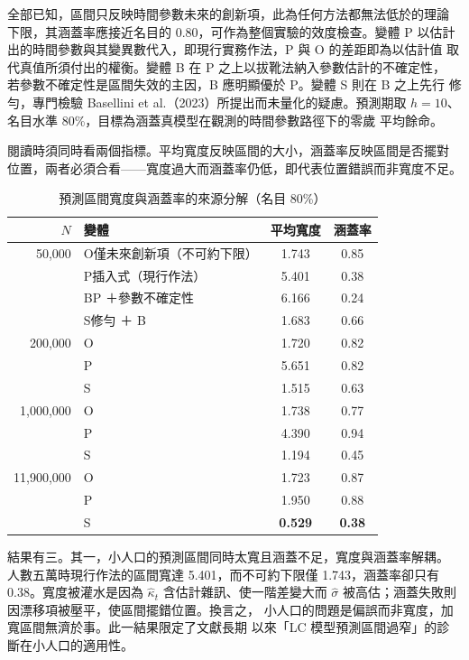 \documentclass[UTF8, fontset=macnew, a4paper, 12pt]{ctexart}
\begin{document}
全部已知，區間只反映時間參數未來的創新項，此為任何方法都無法低於的理論
下限，其涵蓋率應接近名目的 0.80，可作為整個實驗的效度檢查。變體 P 以估計
出的時間參數與其變異數代入，即現行實務作法，P 與 O 的差距即為以估計值
取代真值所須付出的權衡。變體 B 在 P 之上以拔靴法納入參數估計的不確定性，
若參數不確定性是區間失效的主因，B 應明顯優於 P。變體 S 則在 B 之上先行
修勻，專門檢驗 Basellini et al.（2023）所提出而未量化的疑慮。預測期取
$h=10$、名目水準 80\%，目標為涵蓋真模型在觀測的時間參數路徑下的零歲
平均餘命。

閱讀時須同時看兩個指標。平均寬度反映區間的大小，涵蓋率反映區間是否擺對
位置，兩者必須合看——寬度過大而涵蓋率仍低，即代表位置錯誤而非寬度不足。

\begin{table}[H]
\centering
\caption{預測區間寬度與涵蓋率的來源分解（名目 80\%）}
\small
\begin{tabular}{rlcc}
\toprule
$N$ & 變體 & 平均寬度 & 涵蓋率\\
\midrule
50,000 & O\quad 僅未來創新項（不可約下限） & 1.743 & 0.85\\
       & P\quad 插入式（現行作法） & 5.401 & 0.38\\
       & B\quad P ＋參數不確定性 & 6.166 & 0.24\\
       & S\quad 修勻 ＋ B & 1.683 & 0.66\\
\midrule
200,000 & O & 1.720 & 0.82\\
        & P & 5.651 & 0.82\\
        & S & 1.515 & 0.63\\
\midrule
1,000,000 & O & 1.738 & 0.77\\
          & P & 4.390 & 0.94\\
          & S & 1.194 & 0.45\\
\midrule
11,900,000 & O & 1.723 & 0.87\\
           & P & 1.950 & 0.88\\
           & S & \textbf{0.529} & \textbf{0.38}\\
\bottomrule
\end{tabular}
\label{tab:idecomp}
\end{table}

結果有三。其一，小人口的預測區間同時太寬且涵蓋不足，寬度與涵蓋率解耦。
人數五萬時現行作法的區間寬達 5.401，而不可約下限僅 1.743，涵蓋率卻只有
0.38。寬度被灌水是因為 $\hat\kappa_t$ 含估計雜訊、使一階差變大而
$\hat\sigma$ 被高估；涵蓋失敗則因漂移項被壓平，使區間擺錯位置。換言之，
小人口的問題是偏誤而非寬度，加寬區間無濟於事。此一結果限定了文獻長期
以來「LC 模型預測區間過窄」的診斷在小人口的適用性。
\end{document}
